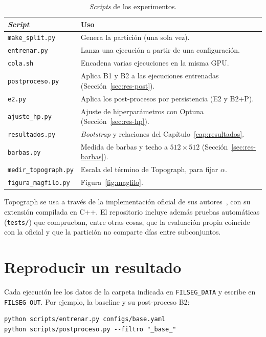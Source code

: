 \begin{table}[ht]
\centering
\small
\begin{tabular}{@{}lp{10.5cm}@{}}
\toprule
\emph{Script} & Uso\\
\midrule
\texttt{make\_split.py} & Genera la partición (una sola vez).\\
\texttt{entrenar.py} & Lanza una ejecución a partir de una configuración.\\
\texttt{cola.sh} & Encadena varias ejecuciones en la misma GPU.\\
\texttt{postproceso.py} & Aplica B1 y B2 a las ejecuciones entrenadas (Sección~\ref{sec:res-post}).\\
\texttt{e2.py} & Aplica los post-procesos por persistencia (E2 y B2+P).\\
\texttt{ajuste\_hp.py} & Ajuste de hiperparámetros con Optuna (Sección~\ref{sec:res-hp}).\\
\texttt{resultados.py} & \emph{Bootstrap} y relaciones del Capítulo~\ref{cap:resultados}.\\
\texttt{barbas.py} & Medida de barbas y techo a $512\times512$ (Sección~\ref{sec:res-barbas}).\\
\texttt{medir\_topograph.py} & Escala del término de Topograph, para fijar $\alpha$.\\
\texttt{figura\_magfilo.py} & Figura~\ref{fig:magfilo}.\\
\bottomrule
\end{tabular}
\caption{\emph{Scripts} de los experimentos.}
\label{tab:scripts}
\end{table}

Topograph se usa a través de la implementación oficial de sus
autores~\cite{lux2025}, con su extensión compilada en C++. El
repositorio incluye además pruebas automáticas (\texttt{tests/}) que
comprueban, entre otras cosas, que la evaluación propia coincide con la
oficial y que la partición no comparte días entre subconjuntos.

\section{Reproducir un resultado}

Cada ejecución lee los datos de la carpeta indicada en
\texttt{FILSEG\_DATA} y escribe en \texttt{FILSEG\_OUT}. Por ejemplo, la
baseline y su post-proceso B2:

\begin{verbatim}
python scripts/entrenar.py configs/base.yaml
python scripts/postproceso.py --filtro "_base_"
\end{verbatim}

